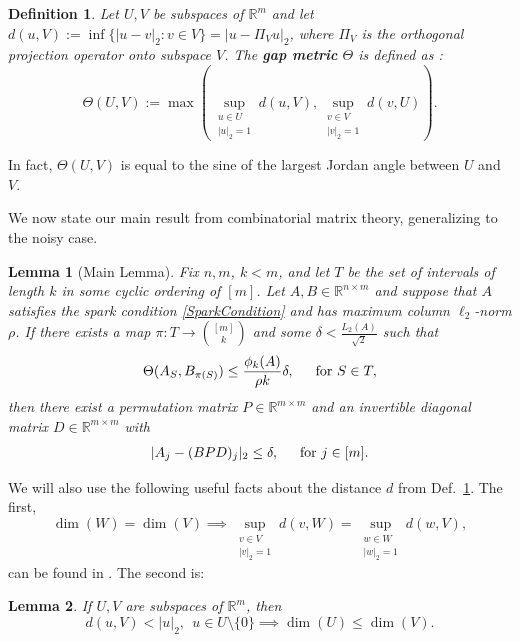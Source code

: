 \documentclass[journal, twocolumn]{IEEEtran}
\newtheorem{lemma}{Lemma}
\newtheorem{definition}{Definition}
\begin{document}
\begin{definition}\label{GapMetricDef}
Let $U, V$ be subspaces of $\mathbb{R}^m$ and let $d(u,V) := \inf\{|u-v|_2: v \in V\} = |u - \Pi_V u|_2$, where $\Pi_V$ is the orthogonal projection operator onto subspace $V$. The \textbf{gap metric} $\Theta$ is defined as \cite{Akhiezer13}:
\begin{equation*}
\Theta(U,V) := \max\left( \sup_{\substack{u \in U \\ |u|_2 = 1}} d(u,V), \sup_{\substack{v \in V \\ |v|_2 = 1}} d(v,U) \right).
\end{equation*}
\end{definition}

In fact, $\Theta(U,V)$ is equal to the sine of the largest Jordan angle between $U$ and $V$. 

We now state our main result from combinatorial matrix theory, generalizing \cite[Lem.~1]{Hillar15} to the noisy case.

\begin{lemma}[Main Lemma]\label{MainLemma}
Fix $n, m$, $k < m$, and let $T$ be the set of intervals of length $k$ in some cyclic ordering of $[m]$. Let $A, B \in \mathbb{R}^{n \times m}$ and suppose that $A$ satisfies the spark condition \eqref{SparkCondition} and has maximum column $\ell_2$-norm $\rho$.  If there exists a map $\pi: T \to {[m] \choose k}$ and some $\delta < \frac{L_{2}(A)}{\sqrt{2}}$ such that 
\begin{equation}\label{GapUpperBound}
\Theta(A_{S}, B_{\pi(S)}) \leq \frac{ \phi_k(A) }{\rho k} \delta, \indent \text{for } S \in T,
\end{equation}
%
then there exist a permutation matrix $P \in \mathbb{R}^{m \times m}$ and an invertible diagonal matrix $D \in \mathbb{R}^{m \times m}$ with
\begin{align*}
|A_j - (BPD)_j|_2 \leq \delta, \indent \text{for } j \in [m].
\end{align*}
\end{lemma}

We will also use the following useful facts about the distance $d$ from Def.~\ref{GapMetricDef}. The first, 
\begin{equation}\label{SubspaceMetricSameDim}
\dim(W) = \dim(V) \implies \sup_{\substack{v \in V \\ |v|_2 = 1}}  d(v,W)  = \sup_{\substack{w \in W \\ |w|_2 = 1}} d(w,V),
\end{equation}
can be found in \cite[Lem.~3.3]{Morris10}. The second is:
\begin{lemma}\label{MinDimLemma}
If $U, V$ are subspaces of $\mathbb{R}^{m}$, then
\begin{equation*}
d(u,V) < |u|_2, \ \ u \in U \setminus{\{0\}} \implies \dim(U) \leq \dim(V).
\end{equation*}
\end{lemma}
\end{document}
